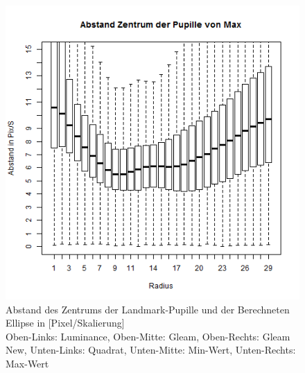 \begin{figure}
	\includegraphics[width=0.32\linewidth]{Eye_Img_Box/Max_Radius_A}
	\caption{Abstand des Zentrums der Landmark-Pupille und der Berechneten Ellipse in [Pixel/Skalierung]\\Oben-Links: Luminance, Oben-Mitte: Gleam, Oben-Rechts: Gleam New, Unten-Links: Quadrat, Unten-Mitte: Min-Wert, Unten-Rechts: Max-Wert}
	\label{ElSe_Gray_Zentrum}
\end{figure}
